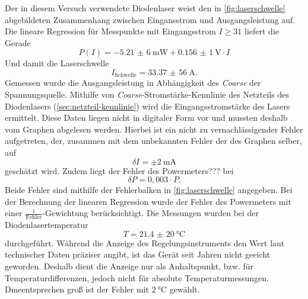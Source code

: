 \documentclass[../bericht.tex]{subfiles}
\begin{document}
        Der in diesem Versuch verwendete Diodenlaser weist den in \cref{fig:laserschwelle} abgebildeten Zusammenhang zwischen Eingansstrom und Ausgangsleistung auf. Die lineare Regression f\"ur Messpunkte mit Eingangsstrom $I\ge 31$ liefert die Gerade
        \begin{equation}
          P(I)=-\SI{5,21(6)}{\milli\watt} + \SI{0,156(1)}{\volt}\cdot I
          \label{eq:laserschwellen-plot}
        \end{equation}
        Und damit die Laserschwelle
        \begin{equation}
          I_\mathrm{Schwelle}=\SI{33,37(56)}{\ampere}.
          \label{eq:laserschwelle}
        \end{equation}
        Gemessen wurde die Ausgangsleistung in Abh\"angigkeit des \textit{Coarse} der Spannungsquelle. Mithilfe von \textit{Coarse}-Stromst\"arke-Kennlinie des Netzteils des Diodenlasers (\cref{sec:netzteil-kennlinie}) wird die Eingangsstromst\"arke des Lasers ermittelt. Diese Daten liegen nicht in digitaler Form vor und mussten deshalb vom Graphen abgelesen werden. Hierbei ist ein nicht zu vernachl\"assigender Fehler aufgetreten, der, zusammen mit dem unbekannten Fehler der des Graphen selber, auf
        \begin{equation*}
          \delta I = \pm \SI{2}{\milli\ampere}
        \end{equation*}
        gesch\"atzt wird. Zudem liegt der Fehler des Powermeters??? bei
        \begin{equation*}
          \delta P = 0,003 \cdot P.
        \end{equation*}
        Beide Fehler sind mithilfe der Fehlerbalken in \cref{fig:laserschwelle} angegeben. Bei der Berechnung der linearen Regression wurde der Fehler des Powermeters mit einer $\frac{1}{\mathrm{Fehler}}$-Gewichtung ber\"ucksichtigt. Die Messungen wurden bei der Diodenlasertemperatur
        \begin{equation*}
          T=\SI{21,4(20)}{\celsius}
        \end{equation*}
        durchgef\"uhrt. W\"ahrend die Anzeige des Regelungsinstruments den Wert laut technischer Daten pr\"aziser angibt, ist das Ger\"at seit Jahren nicht geeicht geworden. Deshalb dient die Anzeige nur als Anhaltspunkt, bzw. f\"ur Temperaturdifferenzen, jedoch nicht f\"ur absolute Temperaturmessungen. Dmeentsprechen gro\ss{} ist der Fehler mit $\SI{2}{\celsius}$  gew\"ahlt.
\end{document}
